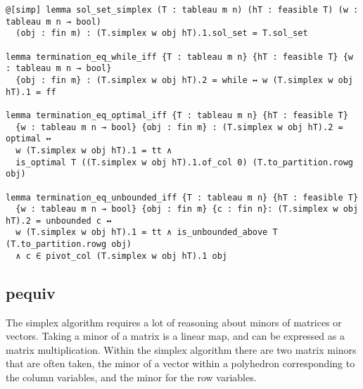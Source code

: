 \documentclass[11pt]{article} %
\begin{document}
\begin{lstlisting}
@[simp] lemma sol_set_simplex (T : tableau m n) (hT : feasible T) (w : tableau m n → bool)
  (obj : fin m) : (T.simplex w obj hT).1.sol_set = T.sol_set

lemma termination_eq_while_iff {T : tableau m n} {hT : feasible T} {w : tableau m n → bool}
  {obj : fin m} : (T.simplex w obj hT).2 = while ↔ w (T.simplex w obj hT).1 = ff

lemma termination_eq_optimal_iff {T : tableau m n} {hT : feasible T}
  {w : tableau m n → bool} {obj : fin m} : (T.simplex w obj hT).2 = optimal ↔
  w (T.simplex w obj hT).1 = tt ∧
  is_optimal T ((T.simplex w obj hT).1.of_col 0) (T.to_partition.rowg obj)

lemma termination_eq_unbounded_iff {T : tableau m n} {hT : feasible T}
  {w : tableau m n → bool} {obj : fin m} {c : fin n}: (T.simplex w obj hT).2 = unbounded c ↔
  w (T.simplex w obj hT).1 = tt ∧ is_unbounded_above T (T.to_partition.rowg obj)
  ∧ c ∈ pivot_col (T.simplex w obj hT).1 obj
\end{lstlisting}

\subsection{pequiv}
The simplex algorithm requires a lot of reasoning about minors of matrices or vectors. Taking a minor of a matrix is a linear map, and can be expressed as a matrix multiplication. Within the simplex algorithm there are two matrix minors that are often taken, the minor of a vector within a polyhedron corresponding to the column variables, and the minor for the row variables.
\end{document}
